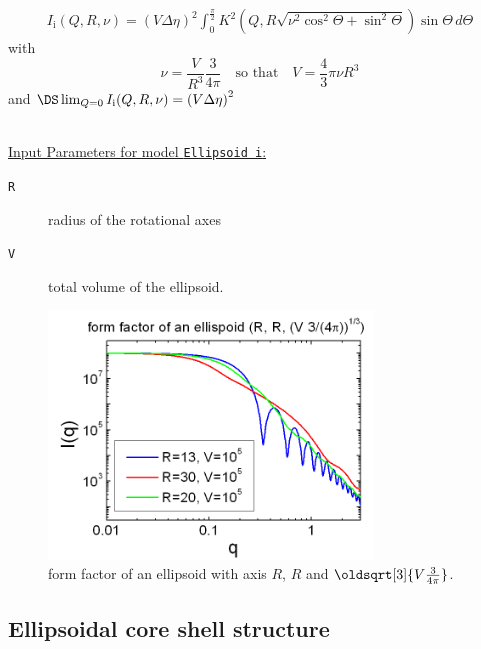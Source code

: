 \begin{align}
I_\text{i}(Q,R,\nu) = \left( V \Delta\eta
\right)^2
 \int_0^{\frac{\pi}{2}}\! K^2\left(Q,R\sqrt{\nu^2\cos^2\Theta+\sin^2\Theta}\right)\sin\Theta\, d\Theta
\end{align}
with
$$
\nu=\frac{V}{R^3}\frac{3}{4\pi} \quad \mbox{so that}\quad V =\frac{4}{3}\pi\nu R^3
$$
and $\DS \lim_{Q=0} I_\text{i}(Q,R,\nu)= \left(V\Delta\eta\right)^2$

~\\
\underline{Input Parameters for model \texttt{Ellipsoid i}:}
\begin{description}
\item[\texttt{R}] radius of the rotational axes
\item[\texttt{V}] total volume of the ellipsoid.
\end{description}

\begin{figure}[htb]
\begin{center}
\includegraphics[width=0.768\textwidth,height=0.588\textwidth]{../images/form_factor/Ellipsoid/ellipsoid_i.png}
\end{center}
\caption{form factor of an ellipsoid with axis $R$, $R$ and
$\oldsqrt[3]{V\frac{3}{4\pi}}$.} \label{fig:I_ellipsoid_i}
\end{figure}
\clearpage
\subsection{Ellipsoidal core shell structure}
\label{sect:EllipsoidalCoreShell} ~\\

